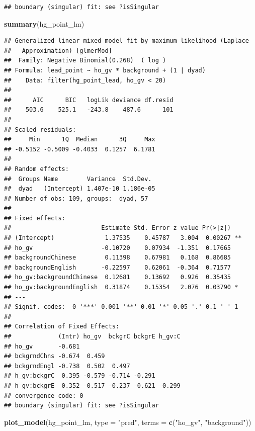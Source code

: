 \documentclass[]{article}
\newenvironment{Shaded}{\begin{snugshade}}{\end{snugshade}}
\newcommand{\DataTypeTok}[1]{\textcolor[rgb]{0.13,0.29,0.53}{#1}}
\newcommand{\KeywordTok}[1]{\textcolor[rgb]{0.13,0.29,0.53}{\textbf{#1}}}
\newcommand{\NormalTok}[1]{#1}
\newcommand{\StringTok}[1]{\textcolor[rgb]{0.31,0.60,0.02}{#1}}
\begin{document}
\begin{verbatim}
## boundary (singular) fit: see ?isSingular
\end{verbatim}

\begin{Shaded}
\begin{Highlighting}[]
\KeywordTok{summary}\NormalTok{(hg_point_lm)}
\end{Highlighting}
\end{Shaded}

\begin{verbatim}
## Generalized linear mixed model fit by maximum likelihood (Laplace
##   Approximation) [glmerMod]
##  Family: Negative Binomial(0.268)  ( log )
## Formula: lead_point ~ ho_gv * background + (1 | dyad)
##    Data: filter(hg_point_lead, ho_gv < 20)
## 
##      AIC      BIC   logLik deviance df.resid 
##    503.6    525.1   -243.8    487.6      101 
## 
## Scaled residuals: 
##     Min      1Q  Median      3Q     Max 
## -0.5152 -0.5009 -0.4033  0.1257  6.1781 
## 
## Random effects:
##  Groups Name        Variance  Std.Dev. 
##  dyad   (Intercept) 1.407e-10 1.186e-05
## Number of obs: 109, groups:  dyad, 57
## 
## Fixed effects:
##                         Estimate Std. Error z value Pr(>|z|)   
## (Intercept)              1.37535    0.45787   3.004  0.00267 **
## ho_gv                   -0.10720    0.07934  -1.351  0.17665   
## backgroundChinese        0.11398    0.67981   0.168  0.86685   
## backgroundEnglish       -0.22597    0.62061  -0.364  0.71577   
## ho_gv:backgroundChinese  0.12681    0.13692   0.926  0.35435   
## ho_gv:backgroundEnglish  0.31874    0.15354   2.076  0.03790 * 
## ---
## Signif. codes:  0 '***' 0.001 '**' 0.01 '*' 0.05 '.' 0.1 ' ' 1
## 
## Correlation of Fixed Effects:
##             (Intr) ho_gv  bckgrC bckgrE h_gv:C
## ho_gv       -0.681                            
## bckgrndChns -0.674  0.459                     
## bckgrndEngl -0.738  0.502  0.497              
## h_gv:bckgrC  0.395 -0.579 -0.714 -0.291       
## h_gv:bckgrE  0.352 -0.517 -0.237 -0.621  0.299
## convergence code: 0
## boundary (singular) fit: see ?isSingular
\end{verbatim}

\begin{Shaded}
\begin{Highlighting}[]
\KeywordTok{plot_model}\NormalTok{(hg_point_lm, }\DataTypeTok{type =} \StringTok{"pred"}\NormalTok{, }\DataTypeTok{terms =} \KeywordTok{c}\NormalTok{(}\StringTok{"ho_gv"}\NormalTok{, }\StringTok{"background"}\NormalTok{))}
\end{Highlighting}
\end{Shaded}
\end{document}
